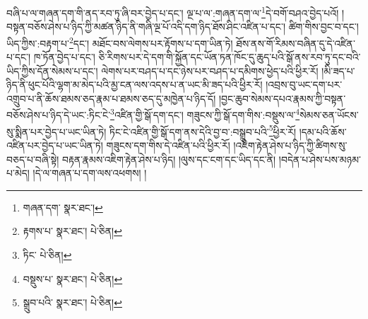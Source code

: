 བཞི་པ་ལ་གཞན་དག་གི་ནད་རབ་ཏུ་ཞི་བར་བྱེད་པ་དང་། ལྔ་པ་ལ་:གཞན་དག་ལ་\footnote{གཞན་དག་  སྣར་ཐང་། }དེ་བགོ་བཤའ་བྱེད་པའོ། །བསྟན་བཅོས་ཤེས་པ་ཉིད་ཀྱི་མཚན་ཉིད་ནི་གཞི་ལྔ་པོ་འདི་དག་ཉིད་ཐོས་ཤིང་འཛིན་པ་དང་། ཚིག་གིས་བྱང་བ་དང་། ཡིད་ཀྱིས་:བརྟག་པ་\footnote{རྟགས་པ་  སྣར་ཐང་།  པེ་ཅིན། }དང་། མཐོང་བས་ལེགས་པར་རྟོགས་པ་དག་ཡིན་ཏེ། ཐོས་ནས་གོ་རིམས་བཞིན་དུ་དེ་འཛིན་པ་དང་། ཁ་ཏོན་བྱེད་པ་དང་། ཅི་རིགས་པར་དེ་དག་གི་སྐྱོན་དང་ཡོན་ཏན་ཁོང་དུ་ཆུད་པའི་སྒོ་ནས་རབ་ཏུ་དང་བའི་ཡིད་ཀྱིས་དོན་སེམས་པ་དང་། ལེགས་པར་བཤད་པ་དང་ཉེས་པར་བཤད་པ་དམིགས་ཕྱེད་པའི་ཕྱིར་རོ། །མི་ཟད་པ་ཉིད་ནི་ཕུང་པོའི་ལྷག་མ་མེད་པའི་མྱ་ངན་ལས་འདས་པ་ན་ཡང་མི་ཟད་པའི་ཕྱིར་རོ། །འབྲས་བུ་ཡང་དག་པར་འགྲུབ་པ་ནི་ཆོས་ཐམས་ཅད་རྣམ་པ་ཐམས་ཅད་དུ་མཁྱེན་པ་ཉིད་དོ། །བྱང་ཆུབ་སེམས་དཔའ་རྣམས་ཀྱི་བསྟན་བཅོས་ཤེས་པ་ཉིད་དེ་ཡང་:ཏིང་ངེ་\footnote{ཏིང་  པེ་ཅིན། }འཛིན་གྱི་སྒོ་དག་དང་། གཟུངས་ཀྱི་སྒོ་དག་གིས་:བསྡུས་ལ་\footnote{བསྡུས་པ་  སྣར་ཐང་།  པེ་ཅིན། }སེམས་ཅན་ཡོངས་སུ་སྨིན་པར་བྱེད་པ་ཡང་ཡིན་ཏེ། ཏིང་ངེ་འཛིན་གྱི་སྒོ་དག་ནས་དེའི་བྱ་བ་:བསྒྲུབ་པའི་\footnote{སྒྲུབ་པའི་  སྣར་ཐང་།  པེ་ཅིན། }ཕྱིར་རོ། །དམ་པའི་ཆོས་འཛིན་པར་བྱེད་པ་ཡང་ཡིན་ཏེ། གཟུངས་དག་གིས་དེ་འཛིན་པའི་ཕྱིར་རོ། །འཇིག་རྟེན་ཤེས་པ་ཉིད་ཀྱི་ཚིགས་སུ་བཅད་པ་བཞི་སྟེ། བརྟན་རྣམས་འཇིག་རྟེན་ཤེས་པ་ཉིད། །ལུས་དང་ངག་དང་ཡིད་དང་ནི། །བདེན་པ་ཤེས་པས་མཉམ་པ་མེད། །དེ་ལ་གཞན་པ་དག་ལས་འཕགས། །
